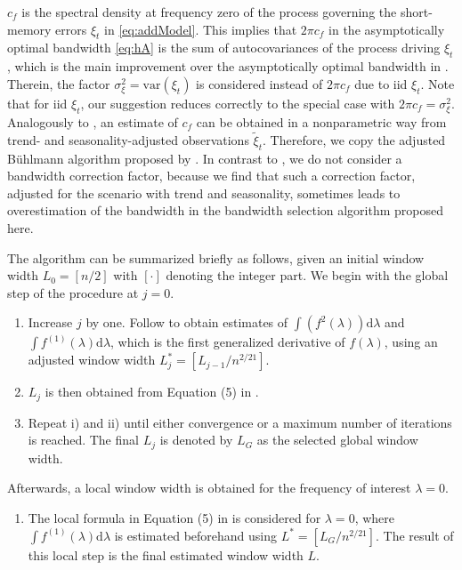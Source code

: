 \(c_f\) is the spectral density at frequency zero of the process governing the short-memory errors \(\xi_t\) in \eqref{eq:addModel}. This implies that \(2\pi c_f\) in the asymptotically optimal bandwidth \eqref{eq:hA} is the sum of autocovariances of the process driving \(\xi_t\), which is the main improvement over the asymptotically optimal bandwidth in \citet{feng2013seasonal}. Therein, the factor \(\sigma_{\xi}^2=\text{var}(\xi_t)\) is considered instead of \(2\pi c_f\) due to iid \(\xi_t\). Note that for iid \(\xi_t\), our suggestion reduces correctly to the special case with \(2\pi c_f = \sigma_\xi^2\). Analogously to \citet{feng2020datadriven}, an estimate of \(c_f\) can be obtained in a nonparametric way from trend- and seasonality-adjusted observations \(\tilde{\xi}_t\). Therefore, we copy the adjusted Bühlmann algorithm \citep{buhlmann1996locally} proposed by \citet{feng2020datadriven}. In contrast to \citet{feng2020datadriven}, we do not consider a bandwidth correction factor, because we find that such a correction factor, adjusted for the scenario with trend and seasonality, sometimes leads to overestimation of the bandwidth in the bandwidth selection algorithm proposed here.

The algorithm can be summarized briefly as follows, given an initial window width \(L_0=[n/2]\) with \([\cdot]\) denoting the integer part. We begin with the global step of the procedure at \(j=0\).

\begin{enumerate}
\def\labelenumi{\roman{enumi})}
\item
  Increase \(j\) by one. Follow \citet{buhlmann1996locally} to obtain estimates of \(\int \left( f^2(\lambda)\right)\text{d}\lambda\) and \(\int f^{(1)}(\lambda)\text{d}\lambda\), which is the first generalized derivative of \(f(\lambda)\), using an adjusted window width \(L^{*}_j=[L_{j-1}/n^{2/21}]\).
\item
  \(L_j\) is then obtained from Equation (5) in \citet{buhlmann1996locally}.
\item
  Repeat i) and ii) until either convergence or a maximum number of iterations is reached. The final \(L_j\) is denoted by \(L_G\) as the selected global window width.
\end{enumerate}

\noindent
Afterwards, a local window width is obtained for the frequency of interest \(\lambda=0\).

\begin{enumerate}
\def\labelenumi{\roman{enumi})}
\setcounter{enumi}{3}
\tightlist
\item
  The local formula in Equation (5) in \citet{buhlmann1996locally} is considered for \(\lambda=0\), where \(\int f^{(1)}(\lambda)\text{d}\lambda\) is estimated beforehand using \(L^{*}=[L_G / n^{2/21}]\). The result of this local step is the final estimated window width \(L\).
\end{enumerate}

